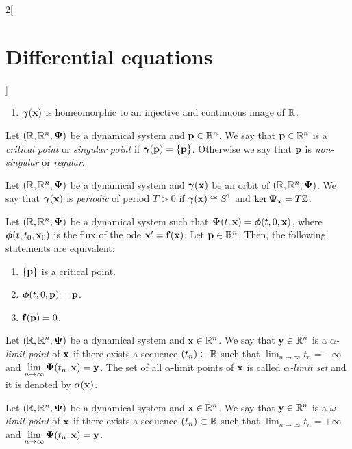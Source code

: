 \documentclass[../../../main.tex]{subfiles}
\begin{document}
\begin{multicols}{2}[\section{Differential equations}]
\begin{prop}
\begin{enumerate}
            \item $\boldsymbol{\mathrm{\gamma}}(\boldsymbol{\mathrm{x}})$ is homeomorphic to an injective and continuous image of $\mathbb{R}$.
        \end{enumerate}
    \end{prop}
    \begin{definition}
        Let $(\mathbb{R},\mathbb{R}^n,\boldsymbol{\mathrm{\Psi}})$ be a dynamical system and $\boldsymbol{\mathrm{p}}\in\mathbb{R}^n$. We say that $\boldsymbol{\mathrm{p}}\in\mathbb{R}^n$ is a \textit{critical point} or \textit{singular point} if $\boldsymbol{\mathrm{\gamma}}(\boldsymbol{\mathrm{p}})=\{\boldsymbol{\mathrm{p}}\}$. Otherwise we say that $\boldsymbol{\mathrm{p}}$ is \textit{non-singular} or \textit{regular}.
    \end{definition}
    \begin{definition}
        Let $(\mathbb{R},\mathbb{R}^n,\boldsymbol{\mathrm{\Psi}})$ be a dynamical system and $\boldsymbol{\mathrm{\gamma}}(\boldsymbol{\mathrm{x}})$ be an orbit of $(\mathbb{R},\mathbb{R}^n,\boldsymbol{\mathrm{\Psi}})$. We say that $\boldsymbol{\mathrm{\gamma}}(\boldsymbol{\mathrm{x}})$ is \textit{periodic} of period $T>0$ if $\boldsymbol{\mathrm{\gamma}}(\boldsymbol{\mathrm{x}})\cong S^1$ and $\ker\boldsymbol{\mathrm{\Psi_{\boldsymbol{\mathrm{x}}}}}=T\mathbb{Z}$.
    \end{definition}
    \begin{prop}
        Let $(\mathbb{R},\mathbb{R}^n,\boldsymbol{\mathrm{\Psi}})$ be a dynamical system such that $\boldsymbol{\mathrm{\Psi}}(t,\boldsymbol{\mathrm{x}})=\boldsymbol{\mathrm{\phi}}(t,0,\boldsymbol{\mathrm{x}})$, where $\boldsymbol{\mathrm{\phi}}(t,t_0,\boldsymbol{\mathrm{x}}_0)$ is the flux of the ode $\boldsymbol{\mathrm{x}}' =\boldsymbol{\mathrm{f}}(\boldsymbol{\mathrm{x}})$. Let $\boldsymbol{\mathrm{p}}\in\mathbb{R}^n$. Then, the following statements are equivalent:
        \begin{enumerate}
            \item $\{\boldsymbol{\mathrm{p}}\}$ is a critical point.
            \item $\boldsymbol{\mathrm{\phi}}(t,0,\boldsymbol{\mathrm{p}})=\boldsymbol{\mathrm{p}}$.
            \item $\boldsymbol{\mathrm{f}}(\boldsymbol{\mathrm{p}})=0$.
        \end{enumerate}
    \end{prop}
    \begin{definition}
        Let $(\mathbb{R},\mathbb{R}^n,\boldsymbol{\mathrm{\Psi}})$ be a dynamical system and $\boldsymbol{\mathrm{x}}\in\mathbb{R}^n$. We say that $\boldsymbol{\mathrm{y}}\in\mathbb{R}^n$ is a \textit{$\alpha$-limit point} of $\boldsymbol{\mathrm{x}}$ if there exists a sequence $(t_n)\subset\mathbb{R}$ such that $\displaystyle\lim_{n\to\infty}t_n=-\infty$ and $\displaystyle\lim_{n\to\infty}\boldsymbol{\mathrm{\Psi}}(t_n,\boldsymbol{\mathrm{x}})=\boldsymbol{\mathrm{y}}$.
        The set of all $\alpha$-limit points of $\boldsymbol{\mathrm{x}}$ is called \textit{$\alpha$-limit set} and it is denoted by $\alpha(\boldsymbol{\mathrm{x}})$.
    \end{definition}
    \begin{definition}
        Let $(\mathbb{R},\mathbb{R}^n,\boldsymbol{\mathrm{\Psi}})$ be a dynamical system and $\boldsymbol{\mathrm{x}}\in\mathbb{R}^n$. We say that $\boldsymbol{\mathrm{y}}\in\mathbb{R}^n$ is a \textit{$\omega$-limit point} of $\boldsymbol{\mathrm{x}}$ if there exists a sequence $(t_n)\subset\mathbb{R}$ such that $\displaystyle\lim_{n\to\infty}t_n=+\infty$ and $\displaystyle\lim_{n\to\infty}\boldsymbol{\mathrm{\Psi}}(t_n,\boldsymbol{\mathrm{x}})=\boldsymbol{\mathrm{y}}$.

\end{definition}
\end{multicols}
\end{document}

